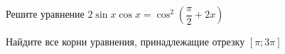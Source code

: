 \begin{ex}
	\begin{condition}
		\begin{enumcols}[label=\asbuk*)]
			\item Решите уравнение \( 2\sin x\cos x= \cos^2{\left(\dfrac{\pi}{2}+2x\right)} \)
			\item Найдите все корни уравнения, принадлежащие отрезку \( \left[\pi;3\pi\right] \)
		\end{enumcols}
	\end{condition}
\end{ex}